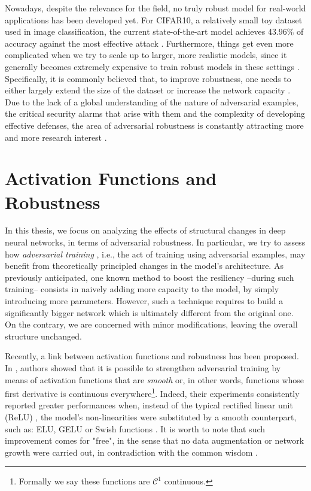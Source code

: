 \documentclass[LaM,binding=0.6cm]{./packages/sapthesis/sapthesis}
\begin{document}
        Nowadays, despite the relevance for the field, no truly robust model for real-world applications has been developed yet. For CIFAR10, a relatively small toy dataset used in image classification, 
        the current state-of-the-art model achieves 43.96\% of accuracy against the most effective attack \cite{cifar10challange}.
        Furthermore, things get even more complicated when we try to scale up to larger, more realistic models, since it generally becomes extremely expensive to train robust models in these settings \cite{free_adv_train}.
        Specifically, it is commonly believed that, to improve robustness, one needs to either largely extend the size of the dataset or increase the network capacity \cite{scaleintriguing}.
        Due to the lack of a global understanding of the nature of adversarial examples, the critical security alarms that arise with them and the complexity of developing effective defenses,
        the area of adversarial robustness is constantly attracting more and more research interest \cite{towards_eval_robustness}.


    \section{Activation Functions and Robustness}

        In this thesis, we focus on analyzing the effects of structural changes in deep neural networks, in terms of adversarial robustness.
        In particular, we try to assess how \textit{adversarial training} \cite{madry_adv_training}, i.e., the act of training using adversarial examples,
        may benefit from theoretically principled changes in the model's architecture.
        As previously anticipated, one known method to boost the resiliency --during such training-- consists in naively adding more capacity to the model, by simply 
        introducing more parameters.  
        However, such a technique requires to build a significantly bigger network which is ultimately different from the original one. On the contrary, we are concerned with 
        minor modifications, leaving the overall structure unchanged.

        Recently, a link between activation functions and robustness has been proposed. In \cite{smooth_adversarial_training}, authors showed that it is possible to strengthen
        adversarial training by means of activation functions that are \textit{smooth} or, in other words, functions whose first derivative is continuous everywhere\footnote{Formally we say these functions are $\mathcal{C}^1$ continuous.}. 
        Indeed, their experiments consistently reported greater performances when, instead of the 
        typical rectified linear unit (ReLU) \cite{relu}, the model's non-linearities were substituted by a smooth counterpart, such as: ELU, GELU or Swish functions \cite{elu} \cite{gelu} \cite{swish}.
        It is worth to note that such improvement comes for "free", in the sense that no data augmentation or network growth were carried out, in contradiction with 
        the common wisdom \cite{freelunch}.
        
\end{document}
